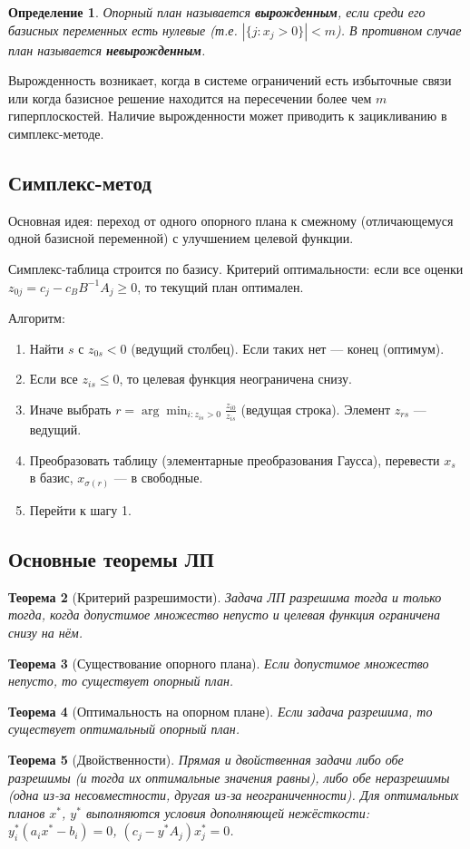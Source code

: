 \documentclass{article}
\theoremstyle{plain}
\newtheorem{theorem}{Теорема}[section]
\newtheorem{definition}[theorem]{Определение}
\begin{document}
\begin{definition}
Опорный план называется \textbf{вырожденным}, если среди его базисных переменных есть нулевые (т.е. $|\{j: x_j > 0\}| < m$). В противном случае план называется \textbf{невырожденным}.
\end{definition}
Вырожденность возникает, когда в системе ограничений есть избыточные связи или когда базисное решение находится на пересечении более чем $m$ гиперплоскостей. Наличие вырожденности может приводить к зацикливанию в симплекс-методе.

\subsection{Симплекс-метод}
Основная идея: переход от одного опорного плана к смежному (отличающемуся одной базисной переменной) с улучшением целевой функции.

Симплекс-таблица строится по базису. Критерий оптимальности: если все оценки $z_{0j} = c_j - c_B B^{-1}A_j \ge 0$, то текущий план оптимален.

Алгоритм:
\begin{enumerate}
\item Найти $s$ с $z_{0s} < 0$ (ведущий столбец). Если таких нет — конец (оптимум).
\item Если все $z_{is} \le 0$, то целевая функция неограничена снизу.
\item Иначе выбрать $r = \arg\min_{i: z_{is}>0} \frac{z_{i0}}{z_{is}}$ (ведущая строка). Элемент $z_{rs}$ — ведущий.
\item Преобразовать таблицу (элементарные преобразования Гаусса), перевести $x_s$ в базис, $x_{\sigma(r)}$ — в свободные.
\item Перейти к шагу 1.
\end{enumerate}

\subsection{Основные теоремы ЛП}
\begin{theorem}[Критерий разрешимости]
Задача ЛП разрешима тогда и только тогда, когда допустимое множество непусто и целевая функция ограничена снизу на нём.
\end{theorem}
\begin{theorem}[Существование опорного плана]
Если допустимое множество непусто, то существует опорный план.
\end{theorem}
\begin{theorem}[Оптимальность на опорном плане]
Если задача разрешима, то существует оптимальный опорный план.
\end{theorem}
\begin{theorem}[Двойственности]
Прямая и двойственная задачи либо обе разрешимы (и тогда их оптимальные значения равны), либо обе неразрешимы (одна из-за несовместности, другая из-за неограниченности). Для оптимальных планов $x^*$, $y^*$ выполняются условия дополняющей нежёсткости: $y_i^*(a_i x^* - b_i) = 0$, $(c_j - y^*A_j)x_j^* = 0$.
\end{theorem}
\end{document}
